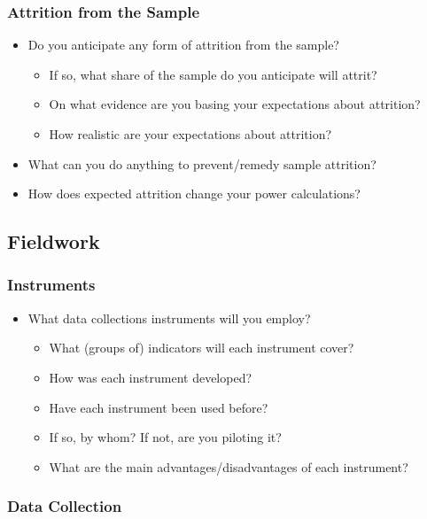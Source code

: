 \documentclass[12pt]{article}
\begin{document}
\subsubsection{Attrition from the Sample}

\begin{itemize}
\item Do you anticipate any form of attrition from the sample?
\begin{itemize}
\item If so, what share of the sample do you anticipate will attrit? 
\item On what evidence are you basing your expectations about attrition?
\item How realistic are your expectations about attrition?
\end{itemize}
\item What can you do anything to prevent/remedy sample attrition?
\item How does expected attrition change your power calculations?
\end{itemize}

\subsection{Fieldwork}

\subsubsection{Instruments}

\begin{itemize}
\item What data collections instruments will you employ?
\begin{itemize}
\item What (groups of) indicators will each instrument cover?
\item How was each instrument developed?
\item Have each instrument been used before? 
\item If so, by whom? If not, are you piloting it?
\item What are the main advantages/disadvantages of each instrument? 
\end{itemize}
\end{itemize}

\subsubsection{Data Collection}
\end{document}
